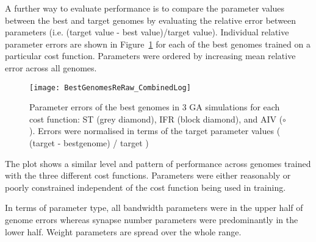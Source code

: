 A further way to evaluate {\GA} performance is to compare the parameter
values between the best and target genomes by evaluating the relative error
between parameters (i.e. (target value - best value)/target
value). Individual relative parameter errors are shown in
Figure~\ref{fig:GA:R2} for each of the best genomes trained on a particular
cost function. Parameters were ordered by increasing mean relative error
across all genomes.

\smallskip{}

\begin{figure}[th!]
  \centering
  \texttt{[image: BestGenomesReRaw\_CombinedLog]}
  \caption[Best genome parameter errors]{Parameter errors of the best
    genomes in 3 {GA} simulations for each cost function: ST (grey
    diamond),%
    IFR (block diamond),%
    and AIV (${\circ}$). Errors were normalised in terms of the target
    parameter values ( (target - bestgenome) / target )}\label{fig:GA:R2}
\end{figure}


The plot shows a similar level and pattern of performance across genomes
trained with the three different cost functions. Parameters were either
reasonably or poorly constrained independent of the cost function being
used in training.

\smallskip{}

In terms of parameter type, all bandwidth parameters were in the upper half
of genome errors whereas synapse number parameters were predominantly in
the lower half.  Weight parameters are spread over the whole range.


% 




